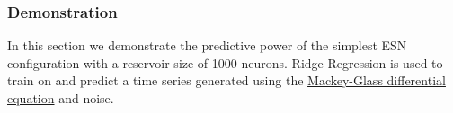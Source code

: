 \subsubsection*{Demonstration}
In this section we demonstrate the predictive power of the simplest ESN configuration with a reservoir size of 1000 neurons. Ridge Regression is used to train on and predict a time series generated using the \href{http://www.scholarpedia.org/article/Mackey-Glass_equation}{Mackey-Glass differential equation} and noise.


